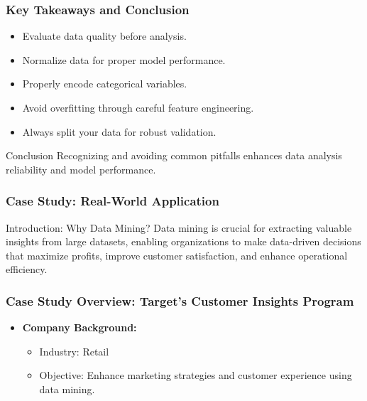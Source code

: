 \documentclass[aspectratio=169]{beamer}
\begin{document}
\begin{frame}[fragile]
    \frametitle{Key Takeaways and Conclusion}
    \begin{itemize}
        \item Evaluate data quality before analysis.
        \item Normalize data for proper model performance.
        \item Properly encode categorical variables.
        \item Avoid overfitting through careful feature engineering.
        \item Always split your data for robust validation.
    \end{itemize}
    \begin{block}{Conclusion}
        Recognizing and avoiding common pitfalls enhances data analysis reliability and model performance.
    \end{block}
\end{frame}

\begin{frame}[fragile]
    \frametitle{Case Study: Real-World Application}
    \begin{block}{Introduction: Why Data Mining?}
        Data mining is crucial for extracting valuable insights from large datasets, enabling organizations to make data-driven decisions that maximize profits, improve customer satisfaction, and enhance operational efficiency.
    \end{block}
\end{frame}

\begin{frame}[fragile]
    \frametitle{Case Study Overview: Target's Customer Insights Program}
    \begin{itemize}
        \item \textbf{Company Background:}
            \begin{itemize}
                \item Industry: Retail
                \item Objective: Enhance marketing strategies and customer experience using data mining.
            \end{itemize}
    \end{itemize}
\end{frame}
\end{document}

